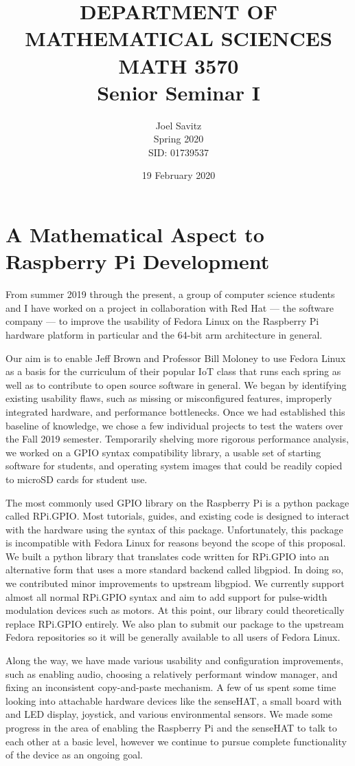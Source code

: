 \documentclass[12pt]{amsart}
\date{19 February 2020}
\title{DEPARTMENT OF MATHEMATICAL SCIENCES \protect\\
MATH 3570 \protect\\
Senior Seminar I}
\author{Joel Savitz \\ Spring 2020 \\ SID: 01739537}
\begin{document}
\maketitle

\section*{A Mathematical Aspect to Raspberry Pi Development}

From summer 2019 through the present, a group of computer science students and I have worked on a project in collaboration with Red Hat --- the software company --- to improve the usability of Fedora Linux on the Raspberry Pi hardware platform in particular and the 64-bit arm architecture in general.

Our aim is to enable Jeff Brown and Professor Bill Moloney to use Fedora Linux as a basis for the curriculum of their popular IoT class that runs each spring as well as to contribute to open source software in general.
We began by identifying existing usability flaws, such as missing or misconfigured features, improperly integrated hardware, and performance bottlenecks. Once we had established this baseline of knowledge, we chose a few individual projects to test the waters over the Fall 2019 semester. Temporarily shelving more rigorous performance analysis, we worked on a GPIO syntax compatibility library, a usable set of starting software for students, and operating system images that could be readily copied to microSD cards for student use.

The most commonly used GPIO library on the Raspberry Pi is a python package called RPi.GPIO. Most tutorials, guides, and existing code is designed to interact with the hardware using the syntax of this package. Unfortunately, this package is incompatible with Fedora Linux for reasons beyond the scope of this proposal. We built a python library that translates code written for RPi.GPIO into an alternative form that uses a more standard backend called libgpiod. In doing so, we contributed minor improvements to upstream libgpiod. We currently support almost all normal RPi.GPIO syntax and aim to add support for pulse-width modulation devices such as motors. At this point, our library could theoretically replace RPi.GPIO entirely. We also plan to submit our package to the upstream Fedora repositories so it will be generally available to all users of Fedora Linux.

Along the way, we have made various usability and configuration improvements, such as enabling audio, choosing a relatively performant window manager, and fixing an inconsistent copy-and-paste mechanism. A few of us spent some time looking into attachable hardware devices like the senseHAT, a small board with and LED display, joystick, and various environmental sensors. We made some progress in the area of enabling the Raspberry Pi and the senseHAT to talk to each other at a basic level, however we continue to pursue complete functionality of the device as an ongoing goal.
\end{document}
